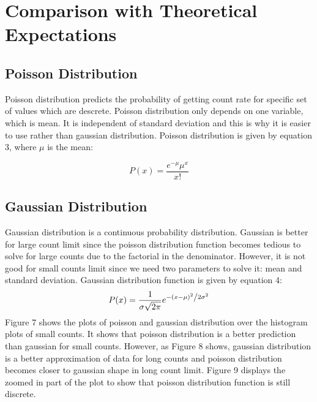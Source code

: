 \documentclass[letterpaper,12pt]{article}
\begin{document}
\section{Comparison with Theoretical Expectations}
\label{sec:comparison with theoretical expectations}
\subsection{Poisson Distribution}
\label{sec:poisson distribution}
Poisson distribution predicts the probability of getting count rate for specific set of values which are descrete. Poisson distribution only depends on one variable, which is mean. It is independent of standard deviation and this is why it is easier to use rather than gaussian distribution. Poisson distribution is given by equation 3, where \begin{math}\mu \end{math} is the mean:

\begin{equation} \label{poisson} P\left( x \right) = \frac{{e^{ - \mu } \mu ^x }}{{x!}} \end{equation}

\subsection{Gaussian Distribution}
\label{sec:gaussian distribution}
Gaussian distribution is a continuous probability distribution. Gaussian is better for large count limit since the poisson distribution function becomes tedious to solve for large counts due to the factorial in the denominator. However, it is not good for small counts limit since we need two parameters to solve it: mean and standard deviation.
Gaussian distribution function is given by equation 4: 
\begin{equation}
\label{gaussian}
P(x) = \frac{1}{{\sigma \sqrt {2\pi } }}e^{{{ - \left( {x - \mu } \right)^2 } \mathord{\left/ {\vphantom {{ - \left( {x - \mu } \right)^2 } {2\sigma ^2 }}} \right. \kern-\nulldelimiterspace} {2\sigma ^2 }}}
\end{equation}
Figure 7 shows the plots of poisson and gaussian distribution over the histogram plots of small counts. It shows that poisson distribution is a better prediction than gaussian for small counts. However, as Figure 8 shows, gaussian distribution is a better approximation of data for long counts and poisson distribution becomes closer to gaussian shape in long count limit. Figure 9 displays the zoomed in part of the plot to show that poisson distribution function is still discrete.
\end{document}
